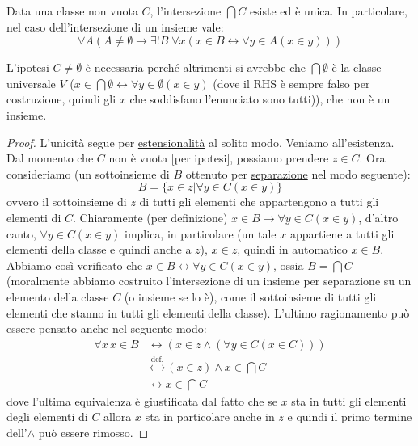 \documentclass[11pt]{scrartcl}
\begin{document}
\begin{proposition}
	Data una classe non vuota $C$, l'intersezione $\bigcap C$ esiste ed è unica. In particolare, nel caso dell'intersezione di un insieme vale:
	\[ \forall A (A \ne \emptyset \rightarrow \exists ! B \; \forall x(x \in B \leftrightarrow \forall y \in A (x \in y)))
		\]
\end{proposition}

\begin{note}
	L'ipotesi $C \ne \emptyset$ è necessaria perché altrimenti si avrebbe che $\bigcap \emptyset$ è la classe universale $V$ ($x \in \bigcap \emptyset \leftrightarrow \forall y \in \emptyset(x \in y)$ (dove il RHS è sempre falso per costruzione, quindi gli $x$ che soddisfano l'enunciato sono tutti)), che non è un insieme.
\end{note}

\begin{proof}
	L'unicità segue per \hyperref[ax2]{estensionalità} al solito modo. Veniamo all'esistenza. Dal momento che $C$ non è vuota [per ipotesi], possiamo prendere $z \in C$. 
	Ora consideriamo (un sottoinsieme di $B$ ottenuto per \hyperref[ax3]{separazione} nel modo seguente):
	\[ B = \{x \in z | \forall y \in C (x \in y)\}
		\]
	ovvero il sottoinsieme di $z$ di tutti gli elementi che appartengono a tutti gli elementi di $C$.
	Chiaramente (per definizione) $x \in B \rightarrow \forall y \in C (x \in y)$, d'altro canto, $\forall y \in C (x \in y)$ implica, in particolare (un tale $x$ appartiene a tutti gli elementi della classe e quindi anche a $z$), $x \in z$, quindi in automatico $x \in B$.\\
	Abbiamo così verificato che $x \in B \leftrightarrow \forall y \in C (x \in y)$, ossia $B = \bigcap C$ (moralmente abbiamo costruito l'intersezione di un insieme per separazione su un elemento della classe $C$ (o insieme se lo è), come il sottoinsieme di tutti gli elementi che stanno in tutti gli elementi della classe). L'ultimo ragionamento può essere pensato anche nel seguente modo:
	\[ \begin{split}
		\forall x \, x \in B & \leftrightarrow (x \in z \land (\forall y \in C(x \in C)))\\
							 & \overset{\text{def.}}{\leftrightarrow} (x \in z) \land x \in \bigcap C \\
							 & \leftrightarrow x \in \bigcap C
	\end{split}
		\]
	dove l'ultima equivalenza è giustificata dal fatto che se $x$ sta in tutti gli elementi degli elementi di $C$ allora $x$ sta in particolare anche in $z$ e quindi il primo termine dell'$\land$ può essere rimosso.
\end{proof}
\end{document}
